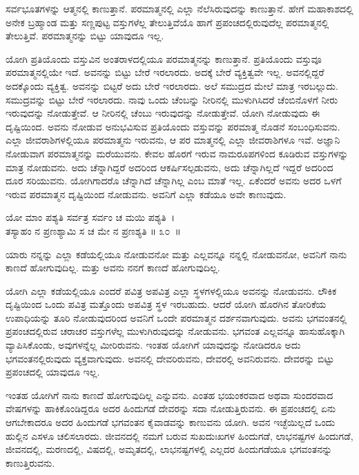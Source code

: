 ಸರ್ವಭೂತಗಳನ್ನು ಆತ್ಮನಲ್ಲಿ ಕಾಣುತ್ತಾನೆ. ಪರಮಾತ್ಮನಲ್ಲಿ ಎಲ್ಲಾ ನೆಲೆಸಿರುವುದನ್ನು ಕಾಣುತ್ತಾನೆ. ಹೇಗೆ ಮಹಾಕಾಶದಲ್ಲಿ ಅನೇಕ ಬ್ರಹ್ಮಾಂಡ ಮತ್ತು ಸಣ್ಣಪುಟ್ಟ ವಸ್ತುಗಳೆಲ್ಲ ತೇಲುತ್ತಿವೆಯೊ ಹಾಗೆ ಪ್ರಪಂಚದಲ್ಲಿರುವುದೆಲ್ಲ ಪರಮಾತ್ಮನಲ್ಲಿ ತೇಲುತ್ತಿವೆ. ಪರಮಾತ್ಮನನ್ನು ಬಿಟ್ಟು ಯಾವುದೂ ಇಲ್ಲ.

ಯೋಗಿ ಪ್ರತಿಯೊಂದು ವಸ್ತುವಿನ ಅಂತರಾಳದಲ್ಲಿಯೂ ಪರಮಾತ್ಮನನ್ನು ಕಾಣುತ್ತಾನೆ. ಪ್ರತಿಯೊಂದು ವಸ್ತುವೂ ಪರಮಾತ್ಮನಲ್ಲಿಯೇ ಇದೆ. ಅವನನ್ನು ಬಿಟ್ಟು ಬೇರೆ ಇರಲಾರದು. ಅದಕ್ಕೆ ಬೇರೆ ವ್ಯಕ್ತಿತ್ವವೇ ಇಲ್ಲ. ಅವನಲ್ಲಿದ್ದರೆ ಅದಕ್ಕೊಂದು ವ್ಯಕ್ತಿತ್ವ. ಅವನನ್ನು ಬಿಟ್ಟರೆ ಅದು ಬೇರೆ ಇರಲಾರದು. ಅಲೆ ಸಮುದ್ರದ ಮೇಲೆ ಮಾತ್ರ ಇರಬಲ್ಲುದು. ಸಮುದ್ರವನ್ನು ಬಿಟ್ಟು ಬೇರೆ ಇರಲಾರದು. ನಾವು ಒಂದು ಚೆಂಬನ್ನು ನೀರಿನಲ್ಲಿ ಮುಳುಗಿಸಿದರೆ ಚೆಂಬಿನೊಳಗೆ ನೀರು ಇರುವುದನ್ನು ನೋಡುತ್ತೇವೆ. ಆ ನೀರಿನಲ್ಲಿ ಚೆಂಬು ಇರುವುದನ್ನು ನೋಡುತ್ತೇವೆ. ಯೋಗಿ ನೋಡುವುದು ಈ ದೃಷ್ಟಿಯಿಂದ. ಅವನು ನೋಡುವ ಅನುಭವಿಸುವ ಪ್ರತಿಯೊಂದು ವಸ್ತುವನ್ನು ಪರಮಾತ್ಮ ನೊಡನೆ ಸಂಬಂಧಿಸುವನು. ಎಲ್ಲಾ ಜೀವರಾಶಿಗಳಲ್ಲಿಯೂ ಪರಮಾತ್ಮನು ಇರುವನು, ಆ ಪರ ಮಾತ್ಮನಲ್ಲಿ ಎಲ್ಲಾ ಜೀವರಾಶಿಗಳೂ ಇವೆ. ಅಜ್ಞಾನಿ ನೋಡುವಾಗ ಪರಮಾತ್ಮನನ್ನು ಮರೆಯುವನು. ಕೇವಲ ಹೊರಗೆ ಇರುವ ನಾಮರೂಪಗಳಿಂದ ಕೂಡಿರುವ ವಸ್ತುಗಳನ್ನು ಮಾತ್ರ ನೋಡುವನು. ಅದು ಚೆನ್ನಾಗಿದ್ದರೆ ಅದರಿಂದ ಆಕರ್ಷಿಸಲ್ಪಡುವನು, ಅದು ಚೆನ್ನಾಗಿಲ್ಲದೆ ಇದ್ದರೆ ಅದರಿಂದ ದೂರ ಸರಿಯುವನು. ಯೋಗಿಗಾದರೊ ಚೆನ್ನಾಗಿದೆ ಚೆನ್ನಾಗಿಲ್ಲ ಎಂಬ ಮಾತೆ ಇಲ್ಲ. ಏಕೆಂದರೆ ಅವನು ಅದರ ಒಳಗೆ ಇರುವ ಪರಮಾತ್ಮನ ದೃಷ್ಟಿಯಿಂದ ನೋಡುವನು. ಅವನಿಗೆ ಎಲ್ಲಾ ಕಡೆಯೂ ಅವೇ ಕಾಣುವುದು.

\begin{shloka}
ಯೋ ಮಾಂ ಪಶ್ಯತಿ ಸರ್ವತ್ರ ಸರ್ವಂ ಚ ಮಯಿ ಪಶ್ಯತಿ~।\\ತಸ್ಯಾಹಂ ನ ಪ್ರಣಶ್ಯಾಮಿ ಸ ಚ ಮೇ ನ ಪ್ರಣಶ್ಯತಿ \hfill॥ ೩೦~॥
\end{shloka}

\begin{artha}
ಯಾರು ನನ್ನನ್ನು ಎಲ್ಲಾ ಕಡೆಯಲ್ಲಿಯೂ ನೋಡುವನೋ ಮತ್ತು ಎಲ್ಲವನ್ನೂ ನನ್ನಲ್ಲಿ ನೋಡುವನೋ, ಅವನಿಗೆ ನಾನು ಕಾಣದೆ ಹೋಗುವುದಿಲ್ಲ. ಮತ್ತು ಅವನು ನನಗೆ ಕಾಣದೆ ಹೋಗುವುದಿಲ್ಲ.
\end{artha}

ಯೋಗಿ ಎಲ್ಲಾ ಕಡೆಯಲ್ಲಿಯೂ ಎಂದರೆ ಪವಿತ್ರ ಅಪವಿತ್ರ ಎಲ್ಲಾ ಸ್ಥಳಗಳಲ್ಲಿಯೂ ಅವನನ್ನು ನೋಡುವನು. ಲೌಕಿಕ ದೃಷ್ಟಿಯಿಂದ ಒಂದು ಪವಿತ್ರ ಮತ್ತೊಂದು ಅಪವಿತ್ರ ಸ್ಥಳ ಇರಬಹುದು. ಆದರೆ ಯೋಗಿ ಹೊರಗಿನ ತೋರಿಕೆಯ ಉಪಾಧಿಯನ್ನು ತೂರಿ ನೋಡುವುದರಿಂದ ಅವನಿಗೆ ಒಂದೇ ಪರಮಾತ್ಮನ ದರ್ಶನವಾಗುವುದು. ಅವನು ಭಗವಂತನಲ್ಲಿ ಪ್ರಪಂಚದಲ್ಲಿರುವ ಚರಾಚರ ವಸ್ತುಗಳೆಲ್ಲ ಮುಳುಗಿರುವುದನ್ನು ನೋಡುವನು. ಭಗವಂತ ಎಲ್ಲವನ್ನೂ ಹಾಸುಹೊಕ್ಕಾಗಿ ವ್ಯಾಪಿಸಿಕೊಂಡು, ಅವುಗಳನ್ನೆಲ್ಲ ಮೀರಿರುವನು. ಇಂತಹ ಯೋಗಿಗೆ ಯಾವುದನ್ನು ನೋಡಿದರೂ ಅದು ಭಗವಂತನಲ್ಲಿರುವುದು ವ್ಯಕ್ತವಾಗುವುದು. ಅವನಲ್ಲಿ ದೇವರಿರುವನು, ದೇವರಲ್ಲಿ ಅವನಿರುವನು. ದೇವರನ್ನು ಬಿಟ್ಟು ಪ್ರಪಂಚದಲ್ಲಿ ಯಾವುದೂ ಇಲ್ಲ.

ಇಂತಹ ಯೋಗಿಗೆ ನಾನು ಕಾಣದೆ ಹೋಗುವುದಿಲ್ಲ ಎನ್ನುವನು. ಎಂತಹ ಭಯಂಕರವಾದ ಅಥವಾ ಸುಂದರವಾದ ವೇಷಗಳನ್ನು ಹಾಕಿಕೊಂಡಿದ್ದರೂ ಅದರ ಹಿಂದುಗಡೆ ದೇವರನ್ನು ಸದಾ ನೋಡುತ್ತಿರುವನು. ಈ ಪ್ರಪಂಚದಲ್ಲಿ ಏನು ಆಗಬೇಕಾದರೂ ಅದರ ಹಿಂದುಗಡೆ ಭಗವಂತನ ಕೈವಾಡವನ್ನು ಕಾಣುವನು ಯೋಗಿ. ಅವನ ಇಚ್ಛೆಯಿಲ್ಲದೆ ಒಂದು ಹುಲ್ಲಿನ ಎಸಳೂ ಚಲಿಸಲಾರದು. ಜೀವನದಲ್ಲಿ ನಮಗೆ ಬರುವ ಸುಖದುಃಖಗಳ ಹಿಂದುಗಡೆ, ಲಾಭನಷ್ಟಗಳ ಹಿಂದುಗಡೆ, ಜೀವನದಲ್ಲಿ, ಮರಣದಲ್ಲಿ, ವಿಷದಲ್ಲಿ, ಅಮೃತದಲ್ಲಿ, ಲಾಭನಷ್ಟಗಳಲ್ಲಿ ಎಲ್ಲದರ ಹಿಂದುಗಡೆಯೂ ಭಗವಂತನನ್ನು ಕಾಣುತ್ತಿರುವನು.


